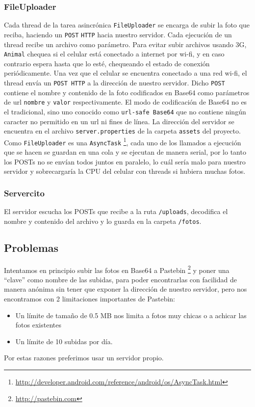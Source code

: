 		\subsubsection{FileUploader}
			Cada thread de la tarea asincrónica \texttt{FileUploader} se encarga de subir la foto que reciba, haciendo un \texttt{POST} \texttt{HTTP} hacia nuestro servidor. Cada ejecución de un thread recibe un archivo como parámetro. Para evitar subir archivos usando 3G, \texttt{Animal} chequea si el celular está conectado a internet por wi-fi, y en caso contrario espera hasta que lo esté, chequeando el estado de conexión periódicamente. Una vez que el celular se encuentra conectado a una red wi-fi, el thread envía un \texttt{POST HTTP} a la dirección de nuestro servidor. Dicho \texttt{POST} contiene el nombre y contenido de la foto codificados en Base64 como parámetros de url \texttt{nombre} y \texttt{valor} respectivamente. El modo de codificación de Base64 no es el tradicional, sino uno conocido como \texttt{url-safe Base64} que no contiene ningún caracter no permitido en un url ni fines de línea. La dirección del servidor se encuentra en el archivo \texttt{server.properties} de la carpeta \texttt{assets} del proyecto.\\
			
			Como \texttt{FileUploader} es una \texttt{AsyncTask} \footnote{\url{http://developer.android.com/reference/android/os/AsyncTask.html}}, cada uno de los llamados a ejecución que se hacen se guardan en una cola y se ejecutan de manera serial, por lo tanto los POSTs no se envían todos juntos en paralelo, lo cuál sería malo para nuestro servidor y sobrecargaría la CPU del celular con threads si hubiera muchas fotos.
		
		\subsubsection{Servercito}
			El servidor escucha los POSTs que recibe a la ruta \texttt{/uploads}, decodifica el nombre y contenido del archivo y lo guarda en la carpeta \texttt{/fotos}.

	\subsection{Problemas}
		Intentamos en principio subir las fotos en Base64 a Pastebin \footnote{ \url{http://pastebin.com} } y poner una ``clave'' como nombre de las subidas, para poder encontrarlas con facilidad de manera anónima sin tener que exponer la dirección de nuestro servidor, pero nos encontramos con 2 limitaciones importantes de Pastebin: 
		\begin{itemize}
			\item Un l\'imite de tamaño de 0.5 MB nos limita a fotos muy chicas o a achicar las fotos existentes
			\item Un l\'imite de 10 subidas por d\'ia.
		\end{itemize}

		Por estas razones preferimos usar un servidor propio.

